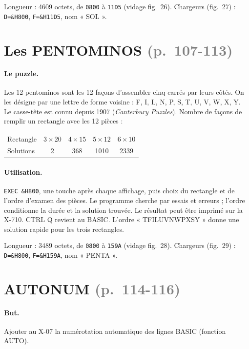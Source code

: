 \documentclass[a4paper,10pt]{article}
\newcommand{\hex}[1]{\texttt{#1}}
\newcommand{\pg}[1]{\texorpdfstring{\textcolor{gray}{\small(p.~#1)}}{}}
\begin{document}
Longueur : 4609 octets, de \hex{0800} à \hex{11D5} (vidage fig.~26).
Chargeurs (fig.~27) : \texttt{D=\&H800}, \texttt{F=\&H11D5}, nom « SOL ».

\section{Les PENTOMINOS \pg{107-113}}

\paragraph{Le puzzle.} Les 12 pentominos sont les 12 façons d'assembler
cinq carrés par leurs côtés. On les désigne par une lettre de forme
voisine : F, I, L, N, P, S, T, U, V, W, X, Y. Le casse-tête est connu depuis
1907 (\emph{Canterbury Puzzles}). Nombre de façons de remplir un rectangle
avec les 12 pièces :
\begin{center}\small
\begin{tabular}{@{}lcccc@{}}
\toprule
Rectangle & $3\times20$ & $4\times15$ & $5\times12$ & $6\times10$ \\
Solutions & 2 & 368 & 1010 & 2339 \\
\bottomrule
\end{tabular}
\end{center}

\paragraph{Utilisation.} \texttt{EXEC \&H800}, une touche après chaque
affichage, puis choix du rectangle et de l'ordre d'examen des pièces. Le
programme cherche par essais et erreurs ; l'ordre conditionne la durée et la
solution trouvée. Le résultat peut être imprimé sur la X-710. CTRL Q revient
au BASIC. L'ordre « TFILUVNWPXSY » donne une solution rapide pour les trois
rectangles.

Longueur : 3489 octets, de \hex{0800} à \hex{159A} (vidage fig.~28).
Chargeurs (fig.~29) : \texttt{D=\&H800}, \texttt{F=\&H159A}, nom « PENTA ».

\section{AUTONUM \pg{114-116}}

\paragraph{But.} Ajouter au X-07 la numérotation automatique des lignes
BASIC (fonction AUTO).
\end{document}
